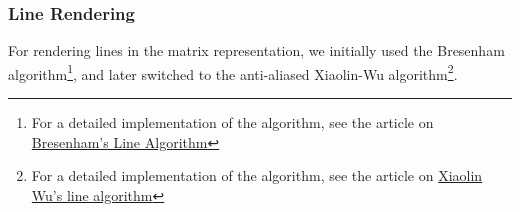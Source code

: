 \subsubsection{Line Rendering}

For rendering lines in the matrix representation, we initially used the Bresenham algorithm\footnote{For a detailed implementation of the algorithm, see the article on \href{https://en.wikipedia.org/wiki/Bresenham\%27s\_line\_algorithm\#Algorithm}{Bresenham's Line Algorithm}}, and later switched to the anti-aliased Xiaolin-Wu algorithm\footnote{For a detailed implementation of the algorithm, see the article on \href{https://en.wikipedia.org/wiki/Xiaolin_Wu\%27s_line_algorithm}{Xiaolin Wu's line algorithm}}.
